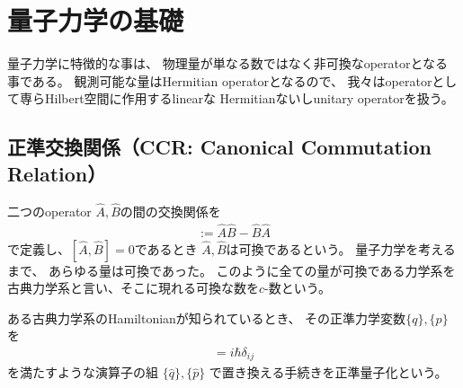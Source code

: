 \section{量子力学の基礎}

量子力学に特徴的な事は、
物理量が単なる数ではなく非可換なoperatorとなる事である。
観測可能な量はHermitian operatorとなるので、
我々はoperatorとして専らHilbert空間に作用するlinearな
Hermitianないしunitary operatorを扱う。

\subsection{正準交換関係（CCR: Canonical Commutation Relation）}

二つのoperator $\hat{A}, \hat{B}$の間の交換関係を
\begin{align}
    [\hat{A}, \hat{B}] := \hat{A} \hat{B} - \hat{B} \hat{A}
\end{align}
で定義し、$[\hat{A}, \hat{B}] = 0$であるとき
$\hat{A}, \hat{B}$は可換であるという。
量子力学を考えるまで、
あらゆる量は可換であった。
このように全ての量が可換である力学系を
古典力学系と言い、そこに現れる可換な数を$c$-数という。

ある古典力学系のHamiltonianが知られているとき、
その正準力学変数$\{q\},\{p\}$を
\begin{align}
    [ \hat{q_i} , \hat{p_j} ] = i\hbar \delta_{ij}
\end{align}
を満たすような演算子の組
$ \{\hat{q}\} , \{\hat{p}\} $
で置き換える手続きを正準量子化という。
